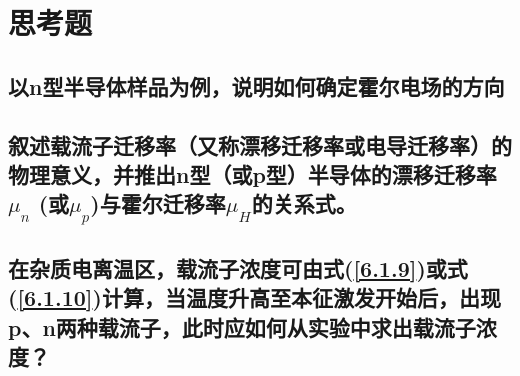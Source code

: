 \documentclass[a4paper]{article}
\begin{document}
\section{思考题}
\subsection{以n型半导体样品为例，说明如何确定霍尔电场的方向}

\subsection{叙述载流子迁移率（又称漂移迁移率或电导迁移率）的物理意义，并推出n型（或p型）半导体的漂移迁移率$\mu_n$ (或$\mu_p$)与霍尔迁移率$\mu_H$的关系式。}
\subsection{在杂质电离温区，载流子浓度可由式(\ref{6.1.9})或式(\ref{6.1.10})计算，当温度升高至本征激发开始后，出现p、n两种载流子，此时应如何从实验中求出载流子浓度？}
\end{document}
